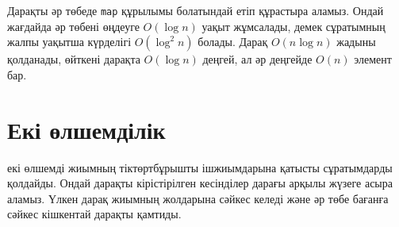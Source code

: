 Дарақты әр төбеде \texttt{map} құрылымы болатындай етіп құрастыра аламыз. Ондай жағдайда
әр төбені өңдеуге $O(\log n)$ уақыт жұмсалады, демек
сұратымның жалпы уақытша күрделігі $O(\log^2 n)$ болады.
Дарақ $O(n \log n)$ жадыны қолданады, өйткені дарақта $O(\log n)$ деңгей, ал 
әр деңгейде $O(n)$ элемент бар. 


\section{Екі өлшемділік}


 екі 
өлшемді жиымның тіктөртбұрышты 
ішжиымдарына қатысты сұратымдарды қолдайды. 
Ондай дарақты кірістірілген кесінділер дарағы арқылы 
жүзеге асыра аламыз. Үлкен дарақ жиымның жолдарына
сәйкес келеді және әр төбе бағанға сәйкес кішкентай дарақты қамтиды. 


